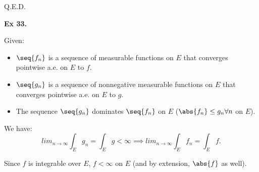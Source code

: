Q.E.D.


\noindent {} \textbf{Ex 33.} \label{ex:4_33}

\begin{thm}
    Given:
    \begin{itemize}
        \item $\seq{f_n}$ is a sequence of             measurable functions on $E$ that converges pointwise a.e. on $E$ to $f$.
        \item $\seq{g_n}$ is a sequence of nonnegative measurable functions on $E$ that converges pointwise a.e. on $E$ to $g$.
        \item The sequence $\seq{g_n}$ dominates $\seq{f_n}$ on $E$ ($\abs{f_n} \leq g_n \forall n$ on $E$).
    \end{itemize}
    We have:
    \[lim_{n\to\infty} \int_E g_n = \int_E g < \infty \implies lim_{n\to\infty} \int_E f_n = \int_E f.\]
\end{thm}


Since $f$ is integrable over $E$, $f < \infty$ on $E$ (and by extension, $\abs{f}$ as well).

